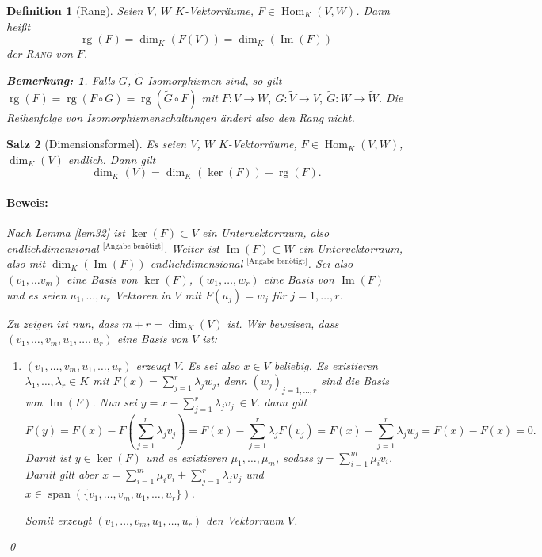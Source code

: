 \documentclass{report}
\newcommand{\IN}[1]{\index{#1|BH}}
\newcommand{\lb}{\lambda}
\DeclareMathOperator{\Span}{span}
\DeclareMathOperator{\Hom}{Hom}
\DeclareMathOperator{\Ima}{Im}
\DeclareMathOperator{\rg}{rg}
\theoremstyle{customrem}
\newtheorem*{bemerkung}{Bemerkung\textnormal:}
\theoremstyle{customdef}
\newtheorem{definition}{Definition}[chapter]
\newtheorem{satz}[definition]{Satz}
\renewenvironment{proof}{\paragraph{Beweis: }}{\qed}
\theoremstyle{customenv}
\newcommand{\defemph}[1]{\textsc{#1}}
\begin{document}
	\begin{definition}[Rang]
		\IN{Rang}
		Seien \(V\), \(W\) \(K\)-Vektorräume, \(F\in\Hom_K(V, W)\). Dann heißt \[\rg(F)=\dim_K(F(V)) = \dim_K(\Ima(F))\] der \defemph{Rang} von \(F\).\\
		\begin{bemerkung}
			Falls \(G\), \(\widetilde{G}\) Isomorphismen sind, so gilt \(\rg(F) = \rg(F\circ G) = \rg(\widetilde{G}\circ F)\) mit \(F:V\to W,\ G:\widetilde{V}\to V,\ \widetilde{G}: W\to\widetilde{W}\). Die Reihenfolge von Isomorphismenschaltungen ändert also den Rang nicht.\\
		\end{bemerkung}
	\end{definition}
	\pagebreak[2]
	\begin{satz}[Dimensionsformel]
		\IN{Dimensionsformel}
		\label{satz37}
		Es seien \(V\), \(W\) \(K\)-Vektorräume, \(F\in\Hom_K(V, W)\), \(\dim_K(V)\) endlich. Dann gilt \[\dim_K(V) = \dim_K(\ker(F))+\rg(F).\]
		\begin{proof}
			Nach \hyperref[lem32]{Lemma \ref*{lem32}} ist \(\ker(F)\subset V\) ein Untervektorraum, also endlichdimensional \({}^\text{[Angabe benötigt]}\). Weiter ist \(\Ima(F)\subset W\) ein Untervektorraum, also mit \(\dim_K(\Ima(F))\) endlichdimensional \({}^\text{[Angabe benötigt]}\). Sei also \((v_1, \ldots v_m)\) eine Basis von \(\ker(F)\), \((w_1,\ldots, w_r)\) eine Basis von \(\Ima(F)\) und es seien \(u_1,\ldots, u_r\) Vektoren in \(V\) mit \(F(u_j)=w_j\) für \(j=1, \ldots, r\).
			
			Zu zeigen ist nun, dass \(m+r=\dim_K(V)\) ist. Wir beweisen, dass \((v_1, \ldots, v_m, u_1, \ldots, u_r)\) eine Basis von \(V\) ist:
			\begin{enumerate}
				\item \((v_1, \ldots, v_m, u_1, \ldots, u_r)\) erzeugt \(V\). Es sei also \(x\in V\) beliebig. Es existieren \(\lb_1, \ldots, \lb_r\in K\) mit \(F(x) = \sum_{j=1}^{r}\lb_j w_j\), denn \((w_j)_{j=1, \ldots, r}\) sind die Basis von \(\Ima(F)\). Nun sei \(y=x-\sum_{j=1}^{r}\lb_j v_j\ \in V\). dann gilt \[F(y) = F(x) - F\left(\sum_{j=1}^{r}\lb_j v_j\right) = F(x) - \sum_{j=1}^{r}\lb_j F(v_j)= F(x) - \sum_{j=1}^{r}\lb_j w_j = F(x)-F(x)=0.\] Damit ist \(y\in \ker(F)\) und es existieren \(\mu_1, \ldots, \mu_m\), sodass \(y=\sum_{i=1}^{m}\mu_i v_i\). Damit gilt aber \(x=\sum_{i=1}^{m}\mu_iv_i + \sum_{j=1}^{r}\lb_jv_j\) und \(x\in \Span(\{v_1, \ldots, v_m, u_1, \ldots, u_r\})\). 
				
				Somit erzeugt \((v_1, \ldots, v_m, u_1, \ldots, u_r)\) den Vektorraum \(V\).
				

\end{enumerate}
\end{proof}
\end{satz}
\end{document}
